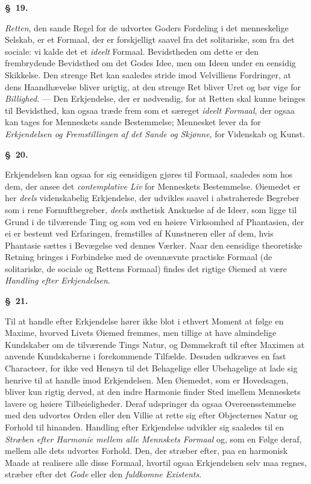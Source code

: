 \documentclass[12pt]{article}
\newcommand{\opage}[1]{\marginnote{\footnotesize\textit{[#1]}}}
\newcommand{\slaw}[1]{\par\medskip\begin{center}\textbf{\S~#1.}\end{center}\nopagebreak}
\begin{document}
\slaw{19}
\emph{Retten}, den sande Regel for de udvortes Goders Fordeling i det menneskelige Selskab, er et Formaal, der er forskjelligt saavel fra det solitariske, som fra det sociale: vi kalde det et \emph{ideelt} Formaal. Bevidstheden om dette er den frembrydende Bevidsthed om det Godes Idee, men om Ideen under en eensidig Skikkelse. Den strenge Ret kan saaledes stride imod Velvilliens Fordringer, at dens Haandhævelse bliver urigtig, at den strenge Ret bliver Uret og bør vige for \emph{Billighed}. --- Den Erkjendelse, der er nødvendig, for at Retten skal kunne bringes til Bevidsthed, kan ogsaa træde frem som et særeget \emph{ideelt Formaal}, der ogsaa kan tages for Menneskets sande Bestemmelse; Mennesket lever da for \emph{Erkjendelsen og Fremstillingen af det Sande og Skjønne}, for Videnskab og Kunst.

\slaw{20}
Erkjendelsen kan ogsaa for sig eensidigen gjøres til Formaal, saaledes som hos dem, der ansee det \emph{contemplative Liv} for Menneskets Bestemmelse. Øiemedet er her \emph{deels} videnskabelig Erkjendelse, der udvikles saavel i abstraherede Begreber som i rene Fornuftbegreber, \emph{deels} æsthetisk Anskuelse af de Ideer, som ligge til Grund i de tilværende Ting og som ved en høiere Virksomhed af Phantasien, der ei er bestemt ved Erfaringen, fremstilles af Kunstneren eller af dem, hvis Phantasie sættes i Bevægelse ved dennes Værker. Naar den eensidige theoretiske Retning bringes i Forbindelse med de ovennævnte practiske Formaal (de solitariske, \opage{152}de sociale og Rettens Formaal) findes det rigtige Øiemed at være \emph{Handling efter Erkjendelsen}.

\slaw{21}
Til at handle efter Erkjendelse hører ikke blot i ethvert Moment at følge en Maxime, hvorved Livets Øiemed fremmes, men tillige at have almindelige Kundskaber om de tilværende Tings Natur, og Dømmekraft til efter Maximen at anvende Kundskaberne i forekommende Tilfælde. Desuden udkræves en fast Characteer, for ikke ved Hensyn til det Behagelige eller Ubehagelige at lade sig henrive til at handle imod Erkjendelsen. Men Øiemedet, som er Hovedsagen, bliver kun rigtig derved, at den indre Harmonie finder Sted imellem Menneskets lavere og høiere Tilbøieligheder. Deraf udspringer da ogsaa Overeensstemmelse med den udvortes Orden eller den Villie at rette sig efter Objecternes Natur og Forhold til hinanden. Handling efter Erkjendelse udvikler sig saaledes til en \emph{Stræben efter Harmonie mellem alle Mennskets Formaal} og, som en Følge deraf, mellem alle dets udvortes Forhold. Den, der stræber efter, paa en harmonisk Maade at realisere alle disse Formaal, hvortil ogsaa Erkjendelsen selv maa regnes, stræber efter det \emph{Gode} eller den \emph{fuldkomne Existents}.
\end{document}

